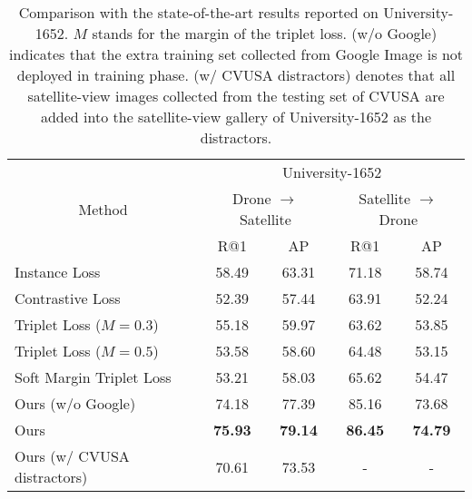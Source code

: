 \documentclass[journal]{IEEEtran}
\begin{document}
\par
\setlength{\tabcolsep}{0.8pt}
\begin{table}[htb]
\small
\caption{
Comparison with the state-of-the-art results reported on University-1652. $M$ stands for the margin of the triplet loss. (w/o Google) indicates that the extra training set collected from Google Image is not deployed in training phase. (w/ CVUSA distractors) denotes that all satellite-view images collected from the testing set of CVUSA are added into the satellite-view gallery of University-1652 as the distractors.} 
\begin{center}
\begin{tabular}{l|cc|cc}
\hline
\multicolumn{1}{c|}{\multirow{3}{*}{Method}} & \multicolumn{4}{c}{University-1652} \\
\cline{2-5}
& \multicolumn{2}{c|}{Drone $\rightarrow$ Satellite} & \multicolumn{2}{c}{Satellite $\rightarrow$ Drone}\\
& R@1 & AP & R@1 & AP \\
\shline
Instance Loss~\cite{zheng_university-1652_nodate} & 58.49 & 63.31 & 71.18 & 58.74 \\
Contrastive Loss~\cite{lin_learning_2015} & 52.39 & 57.44 & 63.91 & 52.24 \\
Triplet Loss ($M=0.3$)~\cite{chechik2009large} & 55.18 & 59.97 & 63.62 & 53.85 \\
Triplet Loss ($M=0.5$)~\cite{chechik2009large} & 53.58 & 58.60 & 64.48 & 53.15 \\
Soft Margin Triplet Loss~\cite{hu_cvm-net_2018} & 53.21 & 58.03 & 65.62 & 54.47 \\
\hline
Ours (w/o Google) & 74.18 & 77.39 & 85.16 & 73.68 \\
Ours & \textbf{75.93} & \textbf{79.14} & \textbf{86.45} & \textbf{74.79} \\
Ours (w/ CVUSA distractors) & 70.61 & 73.53 & - & - \\
\hline
\end{tabular}
\end{center}
\label{table:university1652}
\end{table}
\end{document}
